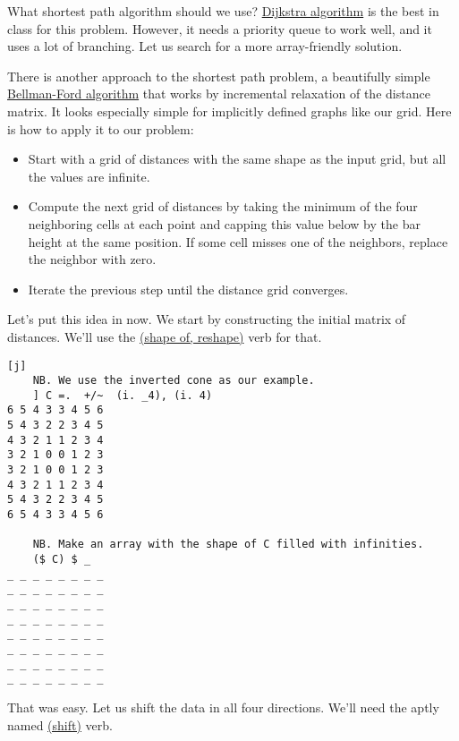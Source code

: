 \documentclass{article}
\begin{document}
What shortest path algorithm should we use?
\href{https://en.wikipedia.org/wiki/Dijkstra%27s_algorithm}{Dijkstra algorithm} is the best in class for this problem.
However, it needs a priority queue to work well, and it uses a lot of branching.
Let us search for a more array-friendly solution.

There is another approach to the shortest path problem, a beautifully simple \href{https://en.wikipedia.org/wiki/Bellman%E2%80%93Ford_algorithm}{Bellman-Ford algorithm} that works by incremental relaxation of the distance matrix.
It looks especially simple for implicitly defined graphs like our grid.
Here is how to apply it to our problem:

\begin{itemize}
  \item 
    Start with a grid of distances with the same shape as the input grid, but all the values are infinite.
  \item 
    Compute the next grid of distances by taking the minimum of the four neighboring cells at each point and capping this value below by the bar height at the same position.
    If some cell misses one of the neighbors, replace the neighbor with zero.
  \item Iterate the previous step until the distance grid converges.
\end{itemize}

Let's put this idea in  now.
We start by constructing the initial matrix of distances.
We'll use the \href{https://code.jsoftware.com/wiki/Vocabulary/dollar}{\code{\$} (shape of, reshape)} verb for that.

\begin{verbatim}[j]
    NB. We use the inverted cone as our example.
    ] C =.  +/~  (i. _4), (i. 4)
6 5 4 3 3 4 5 6
5 4 3 2 2 3 4 5
4 3 2 1 1 2 3 4
3 2 1 0 0 1 2 3
3 2 1 0 0 1 2 3
4 3 2 1 1 2 3 4
5 4 3 2 2 3 4 5
6 5 4 3 3 4 5 6

    NB. Make an array with the shape of C filled with infinities.
    ($ C) $ _
_ _ _ _ _ _ _ _
_ _ _ _ _ _ _ _
_ _ _ _ _ _ _ _
_ _ _ _ _ _ _ _
_ _ _ _ _ _ _ _
_ _ _ _ _ _ _ _
_ _ _ _ _ _ _ _
_ _ _ _ _ _ _ _
\end{verbatim}

That was easy.
Let us shift the data in all four directions.
We'll need the aptly named \href{https://code.jsoftware.com/wiki/Vocabulary/bardot#dyadicfit}{ (shift)} verb.
\end{document}
